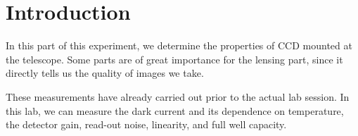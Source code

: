 \section{Introduction}
In this part of this experiment, we determine the properties of CCD mounted at the telescope. Some parts are of great importance for the lensing part, since it directly tells us the quality of images we take.

These measurements have already carried out prior to the actual lab session. In this lab, we can measure the dark current and its dependence on temperature, the detector gain, read-out noise, linearity, and full well capacity.
